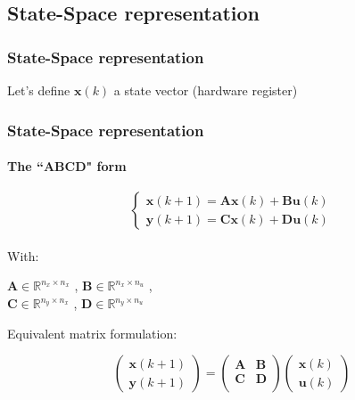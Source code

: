 
\subsection{State-Space representation}
\begin{frame}
	\frametitle{State-Space representation}
	Let's define $\boldsymbol{x}(k)$ a state vector (hardware register)
	\frametitle{State-Space representation}
	\framesubtitle{The ``ABCD" form}
	\begin{equation} \label{abcddef}
		\begin{cases}
			\boldsymbol{x}(k+1)= \boldsymbol{Ax}(k) + \boldsymbol{Bu}(k) \\
			\boldsymbol{y}(k+1)= \boldsymbol{Cx}(k) + \boldsymbol{Du}(k)
		\end{cases}
	\end{equation}
	\\
	With: \\
		\begin{center}
	$\boldsymbol{A} \in \mathbb{R}^{n_x \times n_x}$ ,
	$\boldsymbol{B} \in \mathbb{R}^{n_x \times n_u}$ , \\
	$\boldsymbol{C} \in \mathbb{R}^{n_y \times n_x}$ ,
	$\boldsymbol{D} \in \mathbb{R}^{n_y \times n_u}$
		\end{center}

	Equivalent matrix formulation:
	
	\begin{equation} \label{abcdef}
		\begin{pmatrix}
			\boldsymbol{x} (k+1)  \\
			\boldsymbol{y} (k+1) 
		\end{pmatrix}
		=
		\begin{pmatrix}
			\boldsymbol{A} & \boldsymbol{B} \\
			\boldsymbol{C} & \boldsymbol{D} \\
		\end{pmatrix}
		\begin{pmatrix}
			\boldsymbol{x} (k)  \\
			\boldsymbol{u} (k) 
		\end{pmatrix}
	\end{equation}

\end{frame}

